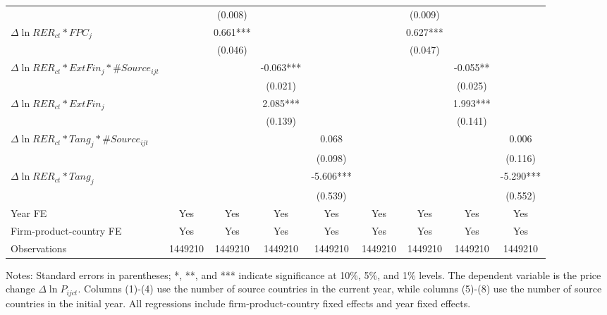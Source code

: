 \documentclass[12pt]{article}
\begin{document}
\begin{table}
{\begin{threeparttable}
\begin{tabular}{lcccccccc}
			&       & (0.008) &       &  &       & (0.009) &       &\\
			$\Delta \ln RER_{ct}*FPC_{j}$ &       & 0.661*** &       &  &       & 0.627*** &       &\\
			&       & (0.046) &       & &       & (0.047) &       & \\
			$\Delta \ln RER_{ct}*ExtFin_{j}*\#Source_{ijt}$ &       &    &   -0.063*** &  &       &    &   -0.055** &\\
			&       &       & (0.021) &  &       &       & (0.025) &\\
			$\Delta \ln RER_{ct}*ExtFin_{j}$ &       &       & 2.085*** &   &       &       & 1.993*** &\\
			&       &       & (0.139) &  &       &       & (0.141) &\\
			$\Delta \ln RER_{ct}*Tang_{j}*\#Source_{ijt}$ &       &       &       & 0.068 &       &       &       & 0.006\\
			&       &       &       & (0.098) &       &       &       & (0.116)\\
			$\Delta \ln RER_{ct}*Tang_{j}$ &       &       &       & -5.606*** &       &       &       & -5.290***\\
			&       &       &       & (0.539) &       &       &       & (0.552)\\
			Year FE  & Yes   & Yes   & Yes   & Yes & Yes   & Yes   & Yes   & Yes\\
			Firm-product-country FE & Yes   & Yes   & Yes   & Yes & Yes   & Yes   & Yes   & Yes\\
			Observations & 1449210 & 1449210 & 1449210 & 1449210 & 1449210 & 1449210 & 1449210 & 1449210\\
			\bottomrule
		\end{tabular}
		\begin{tablenotes}
			\footnotesize
			\item[Notes:] Standard errors in parentheses; *, **, and *** indicate significance at 10\%, 5\%, and 1\% levels. The dependent variable is the price change $\Delta \ln P_{ijct}$. Columns (1)-(4) use the number of source countries in the current year, while columns (5)-(8) use the number of source countries in the initial year. All regressions include firm-product-country fixed effects and year fixed effects.
		\end{tablenotes}
	\end{threeparttable}
	}
	\label{tab.source}
\end{table}
\end{document}
